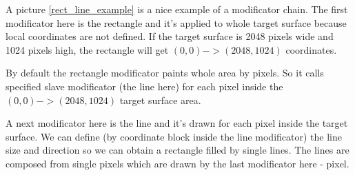 \documentclass[9pt]{article}
\begin{document}
A picture \ref{rect_line_example} is a nice example of a modificator chain. The first
modificator here is the rectangle and it's applied to whole
target surface because local coordinates are not defined. If the target surface
is 2048 pixels wide and 1024 pixels high, the rectangle will get \begin{math}(0,0) 
-> (2048, 1024)\end{math} coordinates. 

By default the rectangle modificator paints whole area by pixels. So it calls
specified slave modificator (the line here) for each pixel inside the \begin{math}(0,0) 
-> (2048, 1024)\end{math} target surface area.

A next modificator here is the line and it's drawn for each pixel inside the
target surface. We can define (by coordinate block inside the line modificator) the line
size and direction so we can obtain a rectangle filled by single lines. 
The lines are composed from single pixels which are drawn by 
the last modificator here - pixel.
\end{document}
